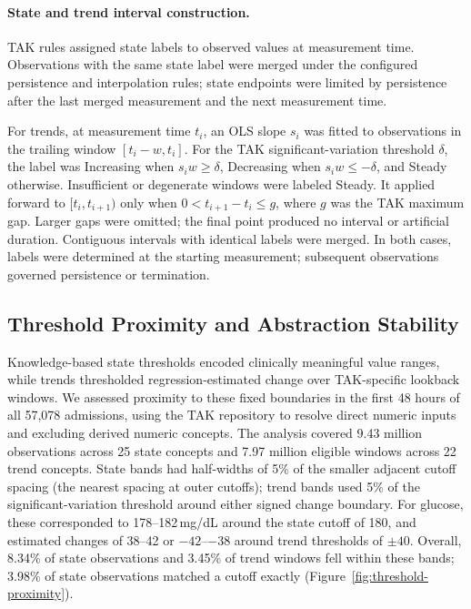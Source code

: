 \paragraph{State and trend interval construction.}
\label{app:abstraction-construction}
TAK rules assigned state labels to observed values at measurement time. Observations with the same state label were merged under the configured persistence and interpolation rules; state endpoints were limited by persistence after the last merged measurement and the next measurement time.

For trends, at measurement time $t_i$, an OLS slope $s_i$ was fitted to observations in the trailing window $[t_i-w,t_i]$. For the TAK significant-variation threshold $\delta$, the label was Increasing when $s_iw\ge\delta$, Decreasing when $s_iw\le-\delta$, and Steady otherwise. Insufficient or degenerate windows were labeled Steady. It applied forward to $[t_i,t_{i+1})$ only when $0<t_{i+1}-t_i\le g$, where $g$ was the TAK maximum gap. Larger gaps were omitted; the final point produced no interval or artificial duration. Contiguous intervals with identical labels were merged. In both cases, labels were determined at the starting measurement; subsequent observations governed persistence or termination.

\subsection{Threshold Proximity and Abstraction Stability}
\label{app:threshold-proximity}

Knowledge-based state thresholds encoded clinically meaningful value ranges, while trends thresholded regression-estimated change over TAK-specific lookback windows. We assessed proximity to these fixed boundaries in the first 48 hours of all 57,078 admissions, using the TAK repository to resolve direct numeric inputs and excluding derived numeric concepts. The analysis covered 9.43 million observations across 25 state concepts and 7.97 million eligible windows across 22 trend concepts. State bands had half-widths of 5\% of the smaller adjacent cutoff spacing (the nearest spacing at outer cutoffs); trend bands used 5\% of the significant-variation threshold around either signed change boundary. For glucose, these corresponded to 178--182\,mg/dL around the state cutoff of 180, and estimated changes of 38--42 or $-42$--$-38$ around trend thresholds of $\pm40$. Overall, 8.34\% of state observations and 3.45\% of trend windows fell within these bands; 3.98\% of state observations matched a cutoff exactly (Figure~\ref{fig:threshold-proximity}).

